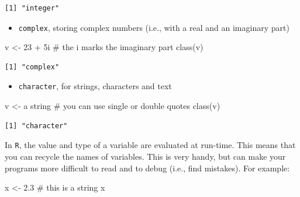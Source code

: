\documentclass[
  letterpaper,
  DIV=11,
  numbers=noendperiod]{scrreprt}
\newenvironment{Shaded}{\begin{snugshade}}{\end{snugshade}}
\newcommand{\CommentTok}[1]{\textcolor[rgb]{0.37,0.37,0.37}{#1}}
\newcommand{\DecValTok}[1]{\textcolor[rgb]{0.68,0.00,0.00}{#1}}
\newcommand{\FunctionTok}[1]{\textcolor[rgb]{0.28,0.35,0.67}{#1}}
\newcommand{\NormalTok}[1]{\textcolor[rgb]{0.00,0.23,0.31}{#1}}
\newcommand{\OtherTok}[1]{\textcolor[rgb]{0.00,0.23,0.31}{#1}}
\newcommand{\SpecialCharTok}[1]{\textcolor[rgb]{0.37,0.37,0.37}{#1}}
\newcommand{\StringTok}[1]{\textcolor[rgb]{0.13,0.47,0.30}{#1}}
\providecommand{\tightlist}{%
  \setlength{\itemsep}{0pt}\setlength{\parskip}{0pt}}\usepackage{longtable,booktabs,array}
\begin{document}
\begin{verbatim}
[1] "integer"
\end{verbatim}

\begin{itemize}
\tightlist
\item
  \texttt{complex}, storing complex numbers (i.e., with a real and an
  imaginary part)
\end{itemize}

\begin{Shaded}
\begin{Highlighting}[]
\NormalTok{v }\OtherTok{\textless{}{-}} \DecValTok{23} \SpecialCharTok{+}\NormalTok{ 5i }\CommentTok{\# the i marks the imaginary part}
\FunctionTok{class}\NormalTok{(v)}
\end{Highlighting}
\end{Shaded}

\begin{verbatim}
[1] "complex"
\end{verbatim}

\begin{itemize}
\tightlist
\item
  \texttt{character}, for strings, characters and text
\end{itemize}

\begin{Shaded}
\begin{Highlighting}[]
\NormalTok{v }\OtherTok{\textless{}{-}} \StringTok{\textquotesingle{}a string\textquotesingle{}} \CommentTok{\# you can use single or double quotes}
\FunctionTok{class}\NormalTok{(v)}
\end{Highlighting}
\end{Shaded}

\begin{verbatim}
[1] "character"
\end{verbatim}

In \texttt{R}, the value and type of a variable are evaluated at
run-time. This means that you can recycle the names of variables. This
is very handy, but can make your programs more difficult to read and to
debug (i.e., find mistakes). For example:

\begin{Shaded}
\begin{Highlighting}[]
\NormalTok{x }\OtherTok{\textless{}{-}} \StringTok{\textquotesingle{}2.3\textquotesingle{}} \CommentTok{\# this is a string}
\NormalTok{x}
\end{Highlighting}
\end{Shaded}
\end{document}
